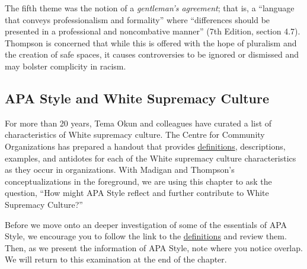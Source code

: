 \documentclass[
  11pt,
]{book}
\begin{document}
The fifth theme was the notion of a \emph{gentleman's agreement}; that is, a ``language that conveys professionalism and formality'' where ``differences should be presented in a professional and noncombative manner'' (7th Edition, section 4.7). Thompson \citeyearpar{thompson_gentlemanly_2004} is concerned that while this is offered with the hope of pluralism and the creation of safe spaces, it causes controversies to be ignored or dismissed and may bolster complicity in racism.

\hypertarget{apa-style-and-white-supremacy-culture}{%
\subsection{APA Style and White Supremacy Culture}\label{apa-style-and-white-supremacy-culture}}

For more than 20 years, Tema Okun \citep{noauthor_white_nodate, okun_white_2021} and colleagues have curated a list of characteristics of White supremacy culture. The Centre for Community Organizations has prepared a handout that provides \href{https://coco-net.org/wp-content/uploads/2019/11/Coco-WhiteSupCulture-ENG4.pdf}{definitions}, descriptions, examples, and antidotes for each of the White supremacy culture characteristics as they occur in organizations. With Madigan \citeyearpar{madigan_language_1995} and Thompson's \citeyearpar{thompson_gentlemanly_2004} conceptualizations in the foreground, we are using this chapter to ask the question, ``How might APA Style reflect and further contribute to White Supremacy Culture?''

Before we move onto an deeper investigation of some of the essentials of APA Style, we encourage you to follow the link to the \href{https://coco-net.org/wp-content/uploads/2019/11/Coco-WhiteSupCulture-ENG4.pdf}{definitions} and review them. Then, as we present the information of APA Style, note where you notice overlap. We will return to this examination at the end of the chapter.
\end{document}
